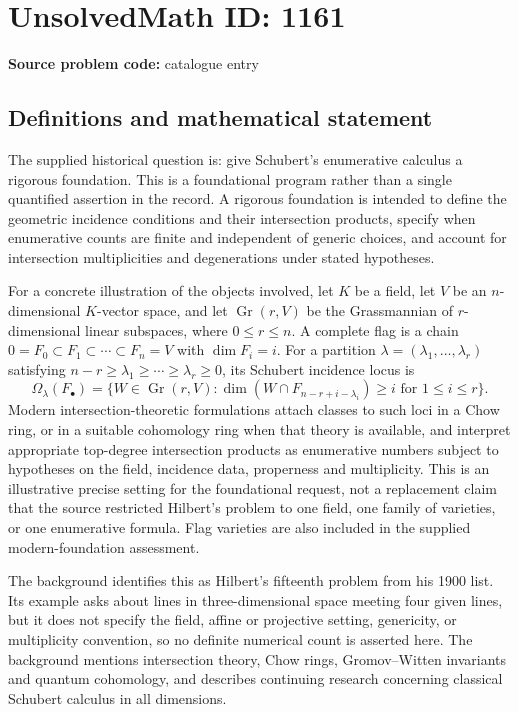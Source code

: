 \documentclass[11pt]{article}
\begin{document}
\section*{UnsolvedMath ID: 1161}
\textbf{Source problem code:} catalogue entry
\subsection{Definitions and mathematical statement}
The supplied historical question is: give Schubert's enumerative calculus a rigorous foundation. This is a foundational program rather than a single quantified assertion in the record. A rigorous foundation is intended to define the geometric incidence conditions and their intersection products, specify when enumerative counts are finite and independent of generic choices, and account for intersection multiplicities and degenerations under stated hypotheses.

For a concrete illustration of the objects involved, let $K$ be a field, let $V$ be an $n$-dimensional $K$-vector space, and let $\operatorname{Gr}(r,V)$ be the Grassmannian of $r$-dimensional linear subspaces, where $0\leq r\leq n$. A complete flag is a chain $0=F_0\subset F_1\subset\cdots\subset F_n=V$ with $\dim F_i=i$. For a partition $\lambda=(\lambda_1,\ldots,\lambda_r)$ satisfying $n-r\geq\lambda_1\geq\cdots\geq\lambda_r\geq0$, its Schubert incidence locus is
\[
\Omega_\lambda(F_\bullet)=\{W\in\operatorname{Gr}(r,V):
\dim(W\cap F_{n-r+i-\lambda_i})\geq i\text{ for }1\leq i\leq r\}.
\]
Modern intersection-theoretic formulations attach classes to such loci in a Chow ring, or in a suitable cohomology ring when that theory is available, and interpret appropriate top-degree intersection products as enumerative numbers subject to hypotheses on the field, incidence data, properness and multiplicity. This is an illustrative precise setting for the foundational request, not a replacement claim that the source restricted Hilbert's problem to one field, one family of varieties, or one enumerative formula. Flag varieties are also included in the supplied modern-foundation assessment.

The background identifies this as Hilbert's fifteenth problem from his 1900 list. Its example asks about lines in three-dimensional space meeting four given lines, but it does not specify the field, affine or projective setting, genericity, or multiplicity convention, so no definite numerical count is asserted here. The background mentions intersection theory, Chow rings, Gromov--Witten invariants and quantum cohomology, and describes continuing research concerning classical Schubert calculus in all dimensions.
\end{document}
